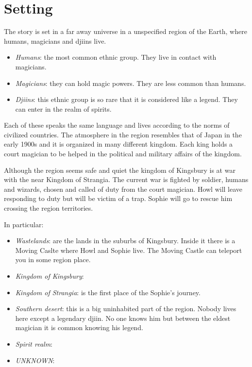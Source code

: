 \section{Setting}
The story is set in a far away universe in a unspecified region of the Earth, where humans, magicians and djiins live.
\begin{itemize}
\item \textit{Humans}: the most common ethnic group. They live in contact with magicians. 
\item \textit{Magicians}: they can hold magic powers. They are less common than humans.
\item \textit{Djiins}: this ethnic group is so rare that it is considered like a legend. They can enter in the realm of spirits.
\end{itemize}
Each of these speaks the same language and lives according to the norms of civilized countries.
The atmosphere in the region resembles that of Japan in the early 1900s and it is organized in many different kingdom.
Each king holds a court magician to be helped in the political and military affairs of the kingdom.

Although the region seems safe and quiet the kingdom of Kingsbury is at war with the near Kingdom of Strangia.
The current war is fighted by soldier, humans and wizards, chosen and called of duty from the court magician.
Howl will leave responding to duty but will be victim of a trap. Sophie will go to rescue him crossing the region territories.

In particular:
\begin{itemize}
\item \textit{Wastelands}:
  are the lands in the suburbs of Kingsbury. Inside it there is a Moving Caslte where Howl and Sophie live. The Moving Castle can teleport you in some region place.
\item \textit{Kingdom of Kingsbury}:  
\item \textit{Kingdom of Strangia}: is the first place of the Sophie's journey. 
\item \textit{Southern desert}: this is a big uninhabited part of the region. Nobody lives here except a legendary djiin. No one knows him but between the eldest magician it is common knowing his legend.
\item \textit{Spirit realm}:
\item \textit{UNKNOWN}:
\end{itemize}



